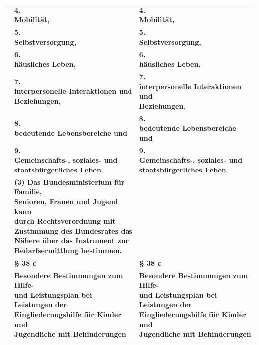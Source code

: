 \documentclass[10pt,a4paper,landscape]{article}
\begin{document}
\begin{longtable}{|L{8.2cm}|L{8.2cm}|L{8.2cm}|}
\hhline{|---|}
 & \textbf{4.   \newline Mobilität, } & \textbf{4.   \newline Mobilität, } \\
\hhline{|---|}
 & \textbf{5.   \newline Selbstversorgung, } & \textbf{5.   \newline Selbstversorgung, } \\
\hhline{|---|}
 & \textbf{6.   \newline häusliches Leben, } & \textbf{6.   \newline häusliches Leben, } \\
\hhline{|---|}
 & \textbf{7.   \newline interpersonelle Interaktionen und  \newline Beziehungen, } & \textbf{7.   \newline interpersonelle Interaktionen und  \newline Beziehungen, } \\
\hhline{|---|}
 & \textbf{8.   \newline bedeutende Lebensbereiche und } & \textbf{8.   \newline bedeutende Lebensbereiche und } \\
\hhline{|---|}
 & \textbf{9.   \newline Gemeinschafts-, soziales- und  \newline staatsbürgerliches Leben. } & \textbf{9.   \newline Gemeinschafts-, soziales- und  \newline staatsbürgerliches Leben. } \\
\hhline{|---|}
 & \textbf{\textcolor{diffred}{(3) Das Bundesministerium für Familie,  \newline Senioren, Frauen und Jugend kann  \newline durch Rechtsverordnung mit  \newline Zustimmung des Bundesrates das  \newline Nähere über das Instrument zur  \newline Bedarfsermittlung bestimmen. }} &  \\
\hhline{|---|}
 & \textbf{\S{} 38 c } & \textbf{\S{} 38 c } \\
\hhline{|---|}
 & \textbf{Besondere Bestimmungen zum Hilfe-  \newline und Leistungsplan bei Leistungen der  \newline Eingliederungshilfe für Kinder und  \newline Jugendliche mit Behinderungen } & \textbf{Besondere Bestimmungen zum Hilfe-  \newline und Leistungsplan bei Leistungen der  \newline Eingliederungshilfe für Kinder und  \newline Jugendliche mit Behinderungen } \\

\end{longtable}
\end{document}
